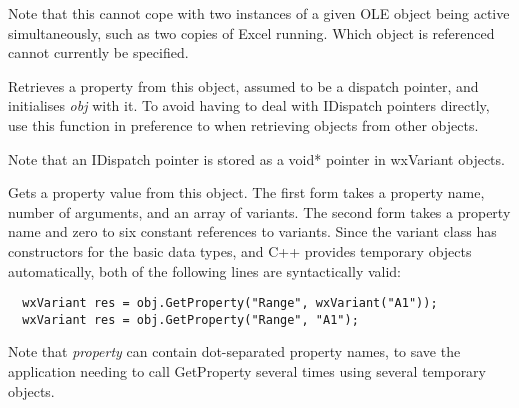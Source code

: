 Note that this cannot cope with two instances of a given OLE object being active simultaneously,
such as two copies of Excel running. Which object is referenced cannot currently be specified.

\label{wxautomationobjectgetobject}


Retrieves a property from this object, assumed to be a dispatch pointer, and initialises {\it obj} with it.
To avoid having to deal with IDispatch pointers directly, use this function in preference
to  when retrieving objects
from other objects.

Note that an IDispatch pointer is stored as a void* pointer in wxVariant objects.



\label{wxautomationobjectgetproperty}



Gets a property value from this object. The first form takes a property name, number of
arguments, and an array of variants. The second form takes a property name and zero to six
constant references to variants. Since the variant class has constructors for the basic
data types, and C++ provides temporary objects automatically, both of the following lines
are syntactically valid:

{\small
\begin{verbatim}
  wxVariant res = obj.GetProperty("Range", wxVariant("A1"));
  wxVariant res = obj.GetProperty("Range", "A1");
\end{verbatim}
}

Note that {\it property} can contain dot-separated property names, to save the application
needing to call GetProperty several times using several temporary objects.

\label{wxautomationobjectinvoke}

